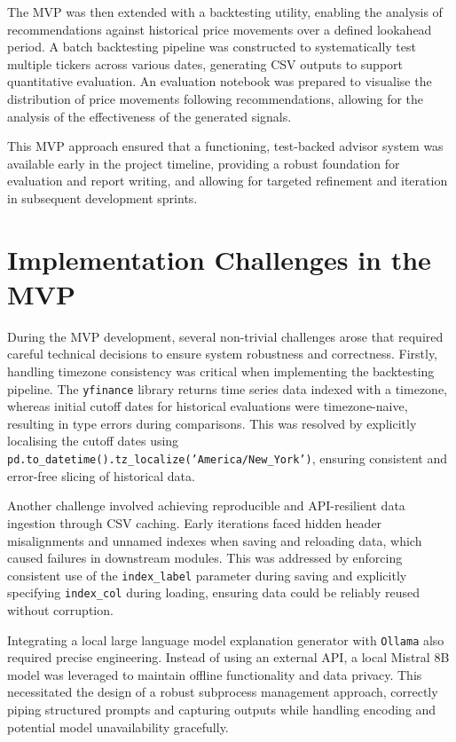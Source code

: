 The MVP was then extended with a backtesting utility, enabling the analysis of recommendations against historical price movements over a defined lookahead period. A batch backtesting pipeline was constructed to systematically test multiple tickers across various dates, generating CSV outputs to support quantitative evaluation. An evaluation notebook was prepared to visualise the distribution of price movements following recommendations, allowing for the analysis of the effectiveness of the generated signals.

This MVP approach ensured that a functioning, test-backed advisor system was available early in the project timeline, providing a robust foundation for evaluation and report writing, and allowing for targeted refinement and iteration in subsequent development sprints.

\section{Implementation Challenges in the MVP}

During the MVP development, several non-trivial challenges arose that required careful technical decisions to ensure system robustness and correctness. Firstly, handling timezone consistency was critical when implementing the backtesting pipeline. The \texttt{yfinance} library returns time series data indexed with a timezone, whereas initial cutoff dates for historical evaluations were timezone-naive, resulting in type errors during comparisons. This was resolved by explicitly localising the cutoff dates using \texttt{pd.to\_datetime().tz\_localize('America/New\_York')}, ensuring consistent and error-free slicing of historical data.

Another challenge involved achieving reproducible and API-resilient data ingestion through CSV caching. Early iterations faced hidden header misalignments and unnamed indexes when saving and reloading data, which caused failures in downstream modules. This was addressed by enforcing consistent use of the \texttt{index\_label} parameter during saving and explicitly specifying \texttt{index\_col} during loading, ensuring data could be reliably reused without corruption.

Integrating a local large language model explanation generator with \texttt{Ollama} also required precise engineering. Instead of using an external API, a local Mistral 8B model was leveraged to maintain offline functionality and data privacy. This necessitated the design of a robust subprocess management approach, correctly piping structured prompts and capturing outputs while handling encoding and potential model unavailability gracefully.

